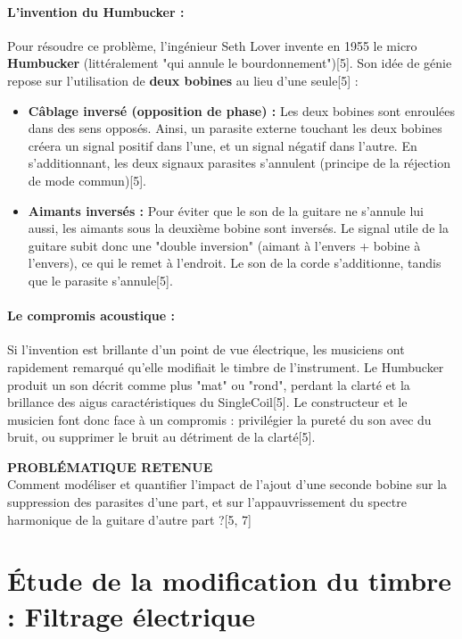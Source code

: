 \documentclass[11pt, a4paper]{article}
\begin{document}
\paragraph{L'invention du Humbucker :}
Pour résoudre ce problème, l'ingénieur Seth Lover invente en 1955 le micro \textbf{Humbucker} (littéralement "qui annule le bourdonnement")[5]. Son idée de génie repose sur l'utilisation de \textbf{deux bobines} au lieu d'une seule[5] :
\begin{itemize}
    \item \textbf{Câblage inversé (opposition de phase) :} Les deux bobines sont enroulées dans des sens opposés. Ainsi, un parasite externe touchant les deux bobines créera un signal positif dans l'une, et un signal négatif dans l'autre. En s'additionnant, les deux signaux parasites s'annulent (principe de la réjection de mode commun)[5].
    \item \textbf{Aimants inversés :} Pour éviter que le son de la guitare ne s'annule lui aussi, les aimants sous la deuxième bobine sont inversés. Le signal utile de la guitare subit donc une "double inversion" (aimant à l'envers + bobine à l'envers), ce qui le remet à l'endroit. Le son de la corde s'additionne, tandis que le parasite s'annule[5].
\end{itemize}

\paragraph{Le compromis acoustique :}
Si l'invention est brillante d'un point de vue électrique, les musiciens ont rapidement remarqué qu'elle modifiait le timbre de l'instrument. Le Humbucker produit un son décrit comme plus "mat" ou "rond", perdant la clarté et la brillance des aigus caractéristiques du SingleCoil[5]. Le constructeur et le musicien font donc face à un compromis : privilégier la pureté du son avec du bruit, ou supprimer le bruit au détriment de la clarté[5].

\vspace{0.5cm}
\noindent\textbf{PROBLÉMATIQUE RETENUE}\\
Comment modéliser et quantifier l'impact de l'ajout d'une seconde bobine sur la suppression des parasites d'une part, et sur l'appauvrissement du spectre harmonique de la guitare d'autre part ?[5, 7]

\newpage
\tableofcontents
\newpage

\section{Étude de la modification du timbre : Filtrage électrique}
\end{document}
